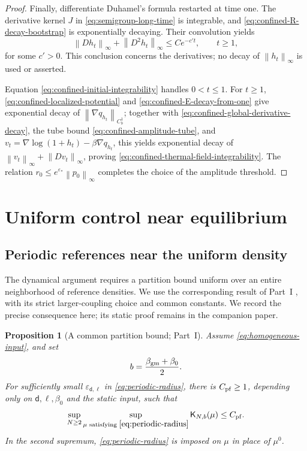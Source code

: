 \documentclass[11pt,reqno]{amsart}
\numberwithin{equation}{section}
\newtheorem{proposition}[proposition]{Proposition}
\theoremstyle{definition}
\theoremstyle{remark}
\renewcommand{\d}{\mathsf d}
\newcommand{\K}{\mathsf K}
\newcommand{\norm}[1]{\left\lVert#1\right\rVert}
\newcommand{\revision}[1]{{\ifdefined\MarkedRevision\color{red}\fi#1}}
\begin{document}
\begin{proof}
Finally, differentiate Duhamel's formula restarted at time one. The derivative kernel $J$ in \eqref{eq:semigroup-long-time} is integrable, and \eqref{eq:confined-R-decay-bootstrap} is exponentially decaying. Their convolution yields
\begin{equation}\label{eq:confined-global-derivative-decay}
 \norm{Dh_t}_\infty+\norm{D^2h_t}_\infty\leq Ce^{-c't},
 \qquad t\geq1,
\end{equation}
for some $c'>0$. This conclusion concerns the derivatives; no decay of $\norm{h_t}_\infty$ is used or asserted.

Equation \eqref{eq:confined-initial-integrability} handles $0<t\leq1$. For $t\geq1$, \eqref{eq:confined-localized-potential} and \eqref{eq:confined-E-decay-from-one} give exponential decay of $\norm{\nabla q_{h_t}}_{C_b^1}$; together with \eqref{eq:confined-global-derivative-decay}, the tube bound \eqref{eq:confined-amplitude-tube}, and $v_t=\nabla\log(1+h_t)-\beta\nabla q_{h_t}$, this yields exponential decay of $\norm{v_t}_\infty+\norm{Dv_t}_\infty$, proving \eqref{eq:confined-thermal-field-integrability}. The relation $r_0\leq e^{\varepsilon_*}\norm{p_0}_\infty$ completes the choice of the amplitude threshold.
\end{proof}
\endgroup

\section{Uniform control near equilibrium}\label{sec:near-equilibrium}

\subsection{\texorpdfstring{\revision{Periodic references near the uniform density}}{Periodic references near the uniform density}}

The dynamical argument requires a partition bound uniform over an entire neighborhood of reference densities. We use the corresponding result of Part~I \revision{\cite[Proposition~5.8, pp.~34--35]{PartI}}, with its strict larger-coupling choice and common constants. We record the precise consequence here; its static proof remains in the companion paper.

\begin{proposition}[A common partition bound; Part~I]\label{prop:uniform-partition}
Assume \eqref{eq:homogeneous-input}, and set
\begin{equation}\label{eq:chosen-buffer}
 b=\frac{\beta_{\rm gm}+\beta_0}{2}.
\end{equation}
For sufficiently small $\varepsilon_{\d,\ell}$ in \eqref{eq:periodic-radius}, there is $C_{\rm pf}\geq1$, depending only on $\d,\ell,\beta_0$ and the static input, such that
\begin{equation}\label{eq:neighborhood-partition}
 \sup_{N\geq2}\sup_{\mu\text{ satisfying }\eqref{eq:periodic-radius}}
                              \K_{N,b}(\mu)\leq C_{\rm pf}.
\end{equation}
In the second supremum, \eqref{eq:periodic-radius} is imposed on $\mu$ in place of $\mu^0$.
\end{proposition}
\end{document}

